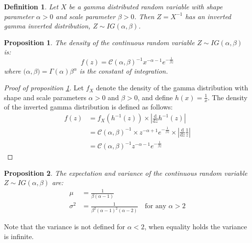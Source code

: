 \documentclass{amsart}
\theoremstyle{plain}
\newtheorem{proposition}{Proposition}[section]
\newtheorem{definition}{Definition}[section]
\theoremstyle{remark}
\numberwithin{equation}{section}
\begin{document}
\begin{definition}
  Let $X$ be a gamma distributed random variable with shape parameter
  $\alpha>0$ and scale parameter $\beta>0$. Then $Z = X^{-1}$ has an
  inverted gamma inverted distribution, $Z\sim IG(\alpha, \beta)$.
\end{definition}

\begin{proposition}\label{InvertedGammaDensity}
  The density of the continuous random variable $Z\sim IG(\alpha,\beta)$ is:
  \[
    f(z) = \mathcal C (\alpha, \beta)^{-1}x^{-\alpha-1}e^{-\frac{1}{\beta z}}
  \]
  where $\mathcal (\alpha, \beta) = \Gamma(\alpha)\beta^{\alpha}$ is the constant of integration.
\end{proposition}

\begin{proof}[Proof of proposition \ref{InvertedGammaDensity}]
  Let $f_X$ denote the density of the gamma distribution with shape
  and scale parameters $\alpha>0$ and $\beta>0$, and define
  $h(x) = \frac{1}{x}$. The density of the inverted gamma distribution
  is defined as follows:
  \[
    \begin{split}
      f(z) &= f_X(h^{-1}(z)) \times \left|\frac{\mathrm d}{\mathrm dz}h^{-1}(z)\right|\\
      &= \mathcal C(\alpha, \beta)^{-1} \times z^{-\alpha+1}e^{-\frac{1}{\beta z}} \times \left|\frac{\mathrm d}{\mathrm dz}\frac{1}{z}\right|\\
      &= \mathcal C(\alpha, \beta)^{-1} z^{-\alpha-1}e^{-\frac{1}{\beta z}}
    \end{split}
  \]
\end{proof}

\begin{proposition}\label{InvertedGammaMoments}
  The expectation and variance of the continuous random variable $Z\sim IG(\alpha,\beta)$ are:
  \[
    \begin{split}
      \mu &= \frac{1}{\beta(\alpha-1)}\\
      \sigma^2 &= \frac{1}{\beta^2(\alpha-1)^2(\alpha-2)} \quad\text{for any }\alpha>2
    \end{split}
  \]
\end{proposition}

Note that the variance is not defined for $\alpha<2$, when equality
holds the variance is infinite.\newline
\end{document}
